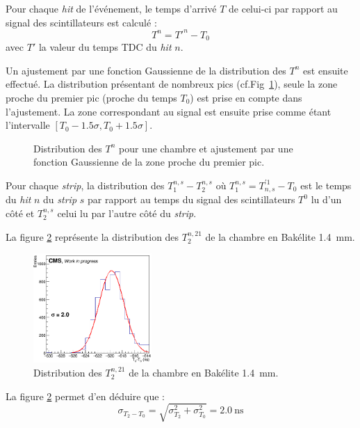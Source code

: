 Pour chaque \textit{hit} de l'événement, le temps d'arrivé $T$ de celui-ci par rapport au signal des scintillateurs est calculé :
\begin{equation}
	T^n=T'^n-T_0
\end{equation}
avec $T'$ la valeur du temps TDC du \textit{hit} $n$. 

Un ajustement par une fonction Gaussienne de la distribution des $T^n$ est ensuite effectué. La distribution présentant de nombreux pics (cf.Fig~\ref{pics}), seule la zone proche du premier pic (proche du temps $T_0$) est prise en compte dans l'ajustement. La zone correspondant au signal est ensuite prise comme étant l'intervalle $\left[T_0-\num{1.5}\sigma,T_0+\num{1.5}\sigma\right]$.

\begin{figure}[!ht]
	\centering
	\caption{Distribution des $T^n$ pour une chambre et ajustement par une fonction Gaussienne de la zone proche du premier pic.}
	\label{pics}
\end{figure}

Pour chaque \textit{strip}, la distribution des $T^{n,s}_1-T^{n,s}_2$ où $T^{n,s}_1=T_{n,s}^{'1}-T_0$ est le temps du \textit{hit} $n$ du \textit{strip} $s$ par rapport au temps du signal des scintillateurs $T^{0}$ lu d'un côté et $T^{n,s}_2$ celui lu par l'autre côté du \textit{strip}.

La figure \ref{t2t0} représente la distribution des $T^{n,21}_2$ de la chambre en Bakélite \SI{1.4}{\milli\meter}.
\begin{figure}[ht!]
	\centering
	\includegraphics[width=0.40\textwidth]{ELE/TimingFitsRunT1T0_zoom_736185.jpg}
	\captionsetup{type=figure}\caption{Distribution des $T^{n,21}_2$ de la chambre en Bakélite \SI{1.4}{\milli\meter}.}
	\label{t2t0}
\end{figure}

La figure \ref{t2t0} permet d'en déduire que :
\begin{equation}
\sigma_{T_2-T_0}=\sqrt{\sigma_{T_2}^2+\sigma_{T_0}^2}=\SI{2.0}{\nano\second}
\end{equation}

